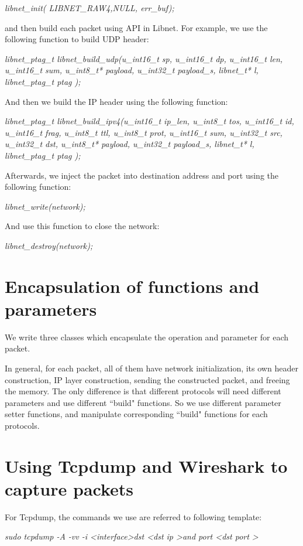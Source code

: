 \documentclass[12pt,letterpaper]{report}
\begin{document}
 \textit{ libnet\_init( LIBNET\_RAW4,NULL, err\_buf);}
 
 and then build each packet using API in Libnet. For 
 example, we use the following function to build UDP 
 header:
 
 \textit{libnet\_ptag\_t libnet\_build\_udp(u\_int16\_t  sp, 
 u\_int16\_t  dp, u\_int16\_t  len, u\_int16\_t  sum, u\_int8\_t*  
 payload, u\_int32\_t  payload\_s, libnet\_t*  l, libnet\_ptag\_t  
 ptag  );}
 
 And then we build the IP header using the following function:
 
 \textit{libnet\_ptag\_t libnet\_build\_ipv4(u\_int16\_t  ip\_len, 
 u\_int8\_t  tos, u\_int16\_t  id, u\_int16\_t  frag, u\_int8\_t  ttl, 
 u\_int8\_t  prot, u\_int16\_t  sum, u\_int32\_t  src, u\_int32\_t  dst,
  u\_int8\_t*  payload, u\_int32\_t  payload\_s, libnet\_t*  l, 
  libnet\_ptag\_t  ptag  );}
 
Afterwards, we inject the packet into destination address and 
port using the following function:

\textit{libnet\_write(network);}

And use this function to close the network:

\textit{libnet\_destroy(network);}

\section*{Encapsulation of functions and parameters}
We write three classes which encapsulate the operation and 
parameter for each packet. 

In general, for each packet, all of them have network 
initialization, its own header construction, IP layer construction,
sending the constructed packet, and freeing the memory. The 
only difference is that different protocols will need different 
parameters and use different ``build" functions. So we use 
different parameter setter functions, and manipulate corresponding
``build" functions for each protocols.


\section*{Using Tcpdump and Wireshark to capture packets}
For Tcpdump, the commands we use are referred to following
template:

\textit{sudo tcpdump -A -vv -i \textless interface\textgreater dst 
\textless dst ip \textgreater and port \textless dst port \textgreater}
\end{document}
